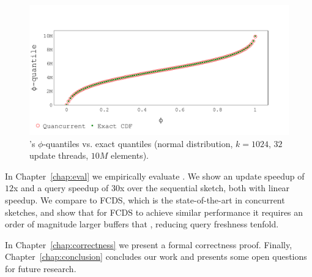 \begin{figure}[htp]
    \centering
    \includegraphics[width=\linewidth,trim={0cm 0.3cm 0cm 1.5cm},clip]
    {graphics/graphs/accuracy/Oracle_Quancurrent_blocking_numa_cdf_normal_k1024_b16_keys10M_runs1_uT32_qT1_snapshot1_17-09-2022_07-00-49.pdf}
    \caption{\mysketch's $\phi$-quantiles vs. exact quantiles (normal distribution, $k=1024$, $32$ update threads, $10M$ elements).}
    \label{fig:intro-query-accuracy}
\end{figure}


In Chapter~\ref{chap:eval} we empirically evaluate \mysketch. We show an update speedup of $12$x and a query speedup of $30$x over the sequential sketch, both with linear speedup. We compare \mysketch to FCDS, which is the state-of-the-art in concurrent sketches, and show that for FCDS to achieve similar performance it requires an order of magnitude larger buffers that \mysketch, reducing query freshness tenfold.

In Chapter~\ref{chap:correctness} we present a formal correctness proof. Finally, Chapter~\ref{chap:conclusion} concludes our work and presents some open questions for future research. 


